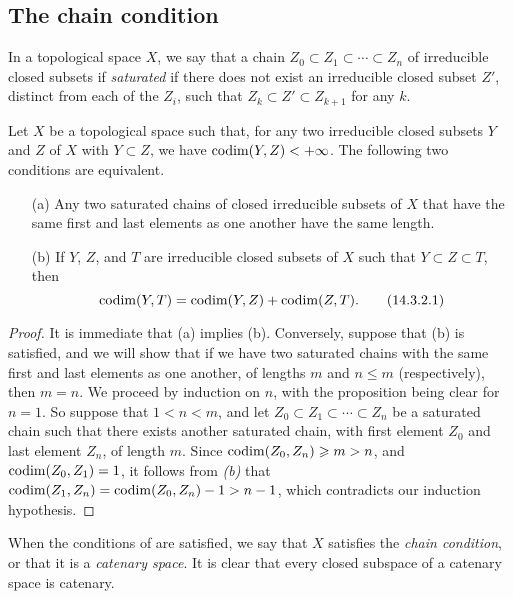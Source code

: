 \subsection{The chain condition}
\label{subsection:0.14.3}

\begin{env}[14.3.1]
\label{0.14.3.1}
In a topological space $X$, we say that a chain $Z_0\subset Z_1\subset\cdots\subset Z_n$ of irreducible closed subsets if \emph{saturated} if there does not exist an irreducible closed subset $Z'$, distinct from each of the $Z_i$, such that $Z_k\subset Z'\subset Z_{k+1}$ for any $k$.
\end{env}

\begin{proposition}[14.3.2]
\label{0.14.3.2}
Let $X$ be a topological space such that, for any two irreducible closed subsets $Y$ and $Z$ of $X$ with $Y\subset Z$, we have $\operatorname{codim}(Y,Z)<+\infty$.
The following two conditions are equivalent.
\begin{enumerate}
  \item[{\rm(a)}] Any two saturated chains of closed irreducible subsets of $X$ that have the same first and last elements as one another have the same length.
  \item[{\rm(b)}] If $Y$, $Z$, and $T$ are irreducible closed subsets of $X$ such that $Y\subset Z\subset T$, then
    \[
    \label{0.14.3.2.1}
      \operatorname{codim}(Y,T)=\operatorname{codim}(Y,Z)+\operatorname{codim}(Z,T).
      \tag{14.3.2.1}
    \]
\end{enumerate}
\end{proposition}

\begin{proof}
It is immediate that (a) implies (b).
Conversely, suppose that (b) is satisfied, and we will show that if we have two saturated chains with the same first and last elements as one another, of lengths $m$ and $n\leq m$ (respectively), then $m=n$.
We proceed by induction on $n$, with the proposition being clear for $n=1$.
So suppose that $1<n<m$, and let $Z_0\subset Z_1\subset\cdots\subset Z_n$ be a
saturated chain such that there exists another saturated chain, with first element $Z_0$ and last element $Z_n$, of length $m$.
Since $\operatorname{codim}(Z_0,Z_n)\geqslant m>n$, and $\operatorname{codim}(Z_0,Z_1)=1$, it follows from \emph{(b)} that $\operatorname{codim}(Z_1,Z_n)=\operatorname{codim}(Z_0,Z_n)-1>n-1$, which contradicts our induction hypothesis.
\end{proof}

When the conditions of  are satisfied, we say that $X$ satisfies the \emph{chain condition}, or that it is a \emph{catenary space}.
It is clear that every closed subspace of a catenary space is catenary.

